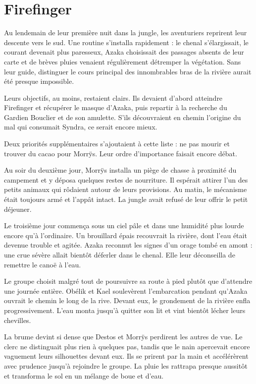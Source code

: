 \chapter{Firefinger}

Au lendemain de leur première nuit dans la jungle, les aventuriers reprirent leur descente vers le sud. Une routine s'installa rapidement : le chenal s'élargissait, le courant devenait plus paresseux, Azaka choisissait des passages absents de leur carte et de brèves pluies venaient régulièrement détremper la végétation. Sans leur guide, distinguer le cours principal des innombrables bras de la rivière aurait été presque impossible.

Leurs objectifs, au moins, restaient clairs. Ils devaient d'abord atteindre Firefinger et récupérer le masque d'Azaka, puis repartir à la recherche du Gardien Bouclier et de son amulette. S'ils découvraient en chemin l'origine du mal qui consumait Syndra, ce serait encore mieux.

\begin{narrateur}
Deux priorités supplémentaires s'ajoutaient à cette liste : ne pas mourir et trouver du cacao pour Morrÿs. Leur ordre d'importance faisait encore débat.
\end{narrateur}

Au soir du deuxième jour, Morrÿs installa un piège de chasse à proximité du campement et y déposa quelques restes de nourriture. Il espérait attirer l'un des petits animaux qui rôdaient autour de leurs provisions. Au matin, le mécanisme était toujours armé et l'appât intact. La jungle avait refusé de leur offrir le petit déjeuner.

Le troisième jour commença sous un ciel pâle et dans une humidité plus lourde encore qu'à l'ordinaire. Un brouillard épais recouvrait la rivière, dont l'eau était devenue trouble et agitée. Azaka reconnut les signes d'un orage tombé en amont : une crue sévère allait bientôt déferler dans le chenal. Elle leur déconseilla de remettre le canoë à l'eau.

Le groupe choisit malgré tout de poursuivre sa route à pied plutôt que d'attendre une journée entière. Obélik et Kael soulevèrent l'embarcation pendant qu'Azaka ouvrait le chemin le long de la rive. Devant eux, le grondement de la rivière enfla progressivement. L'eau monta jusqu'à quitter son lit et vint bientôt lécher leurs chevilles.

La brume devint si dense que Destos et Morrÿs perdirent les autres de vue. Le clerc ne distinguait plus rien à quelques pas, tandis que le nain apercevait encore vaguement leurs silhouettes devant eux. Ils se prirent par la main et accélérèrent avec prudence jusqu'à rejoindre le groupe. La pluie les rattrapa presque aussitôt et transforma le sol en un mélange de boue et d'eau.

